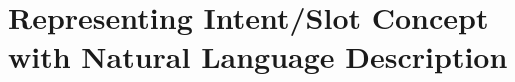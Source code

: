 
\chapter{Representing Intent/Slot Concept with Natural Language Description}
\label{chaper:sgd}

















